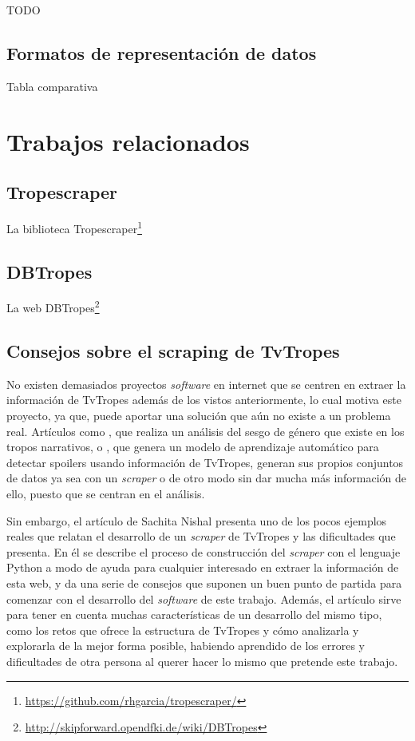 TODO \cite{scraperworld}

\subsection{Formatos de representación de datos}
Tabla comparativa
\section{Trabajos relacionados}
\subsection{Tropescraper}
La biblioteca
Tropescraper\footnote{\url{https://github.com/rhgarcia/tropescraper/}}
\cite{garcia2020startroper}

\subsection{DBTropes}
La web DBTropes\footnote{\url{http://skipforward.opendfki.de/wiki/DBTropes}}
\cite{kiesel2010dbtropes}

\subsection{Consejos sobre el scraping de TvTropes}
No existen demasiados proyectos \textit{software} en internet que se centren en
extraer la información de TvTropes además de los vistos anteriormente, lo cual
motiva este proyecto, ya que, puede aportar una solución que aún no existe a un
problema real. Artículos como \cite{gala2020analyzing}, que realiza un análisis
del sesgo de género que existe en los tropos narrativos, o
\cite{boyd2013spoiler}, que genera un modelo de aprendizaje automático para
detectar spoilers usando información de TvTropes, generan sus propios conjuntos
de datos ya sea con un \textit{scraper} o de otro modo sin dar mucha más
información de ello, puesto que se centran en el análisis. 

Sin embargo, el artículo de Sachita Nishal \cite{nishalscraping} presenta uno de
los pocos ejemplos reales que relatan el desarrollo de un \textit{scraper} de
TvTropes y las dificultades que presenta. En él se describe el proceso de
construcción del \textit{scraper} con el lenguaje Python a modo de ayuda para
cualquier interesado en extraer la información de esta web, y da una serie de
consejos que suponen un buen punto de partida para comenzar con el desarrollo
del \textit{software} de este trabajo. Además, el artículo sirve para tener en
cuenta muchas características de un desarrollo del mismo tipo, como los retos
que ofrece la estructura de TvTropes y cómo analizarla y explorarla de la mejor
forma posible, habiendo aprendido de los errores y dificultades de otra persona
al querer hacer lo mismo que pretende este trabajo.

